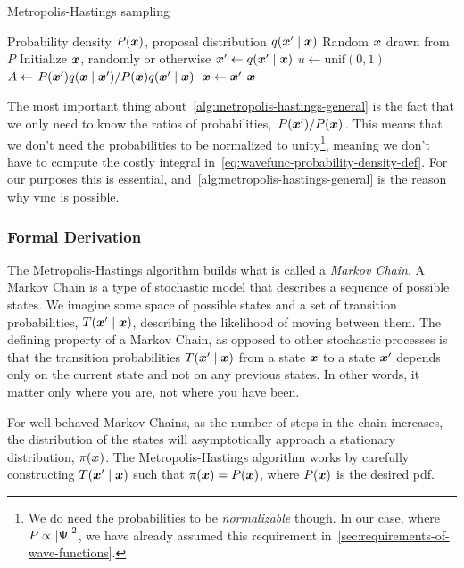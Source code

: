 \documentclass[Thesis.tex]{subfiles}
\begin{document}
\begin{algorithm}[h]
    \caption{Metropolis-Hastings sampling}
    \label{alg:metropolis-hastings-general}
    \begin{algorithmic}[1]
        \Require Probability density $P(\bm{x})$, proposal distribution $q\qty(\bm{x}'\;\middle|\;\bm{x})$
        \Ensure Random $\bm{x}$ drawn from $P$
        \State Initialize $\bm{x}$, randomly or otherwise
        \Repeat
          \State $\bm{x}'\gets q\qty(\bm{x}'\;\middle|\;\bm{x})$
          \State $u\gets\text{unif}(0, 1)$
          \State $A\gets \flatfrac{P(\vx')q\qty(\vx\;\middle|\;\vx')}{P(\vx)q\qty(\vx'\;\middle|\;\vx)}$
            \State $\bm{x} \gets \bm{x}'$
          \EndIf
          \State \Yield $\bm{x}$
    \end{algorithmic}
\end{algorithm}

The most important thing about~\cref{alg:metropolis-hastings-general} is the
fact that we only need to know the ratios of probabilities,
$\flatfrac{P(\vx')}{P(\vx)}$. This means that we don't need the probabilities to
be normalized to unity\footnote{We do need the probabilities to be
\emph{normalizable} though. In our case, where $P\propto \abs{\Psi}^2$, we have
already assumed this requirement in~\cref{sec:requirements-of-wave-functions}.},
meaning we don't have to compute the costly integral
in~\cref{eq:wavefunc-probability-density-def}. For our purposes this is
essential, and~\cref{alg:metropolis-hastings-general} is the reason why \gls{vmc} is
possible.

\subsubsection{Formal Derivation}

The Metropolis-Hastings algorithm builds what is called a \emph{Markov Chain}. A
Markov Chain is a type of stochastic model that describes a sequence of possible
states. We imagine some space of possible states and a set of transition
probabilities, $T\qty(\bm{x}'\;\middle|\;\bm{x})$, describing the likelihood of moving between them.
The defining property of a Markov Chain, as opposed to other stochastic
processes is that the transition probabilities $T\qty(\bm{x}'\;\middle|\;\bm{x})$ from a state $\bm{x}$
to a state $\bm{x}'$ depends only on the current state and not on any previous
states. In other words, it matter only where you are, not where you have been.

For well behaved Markov Chains, as the number of steps in the chain increases,
the distribution of the states will asymptotically approach a stationary
distribution, $\pi(\bm{x})$. The Metropolis-Hastings algorithm works by carefully
constructing $T\qty(\bm{x}'\;\middle|\;\bm{x})$ such that $\pi(\bm{x})=P(\bm{x})$, where $P(\bm{x})$ is the
desired \gls{pdf}.
\end{document}
